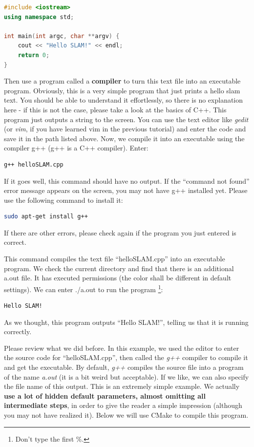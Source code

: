 \begin{lstlisting}[language=C++,caption=slambook2/ch2/helloSLAM.cpp]
#include <iostream>
using namespace std;

int main(int argc, char **argv) {
    cout << "Hello SLAM!" << endl;
    return 0;
}
\end{lstlisting}

Then use a program called a \textbf{compiler} to turn this text file into an executable program. Obviously, this is a very simple program that just prints a hello slam text. You should be able to understand it effortlessly, so there is no explanation here - if this is not the case, please take a look at the basics of C++. This program just outputs a string to the screen. You can use the text editor like \textit{gedit} (or \textit{vim}, if you have learned vim in the previous tutorial) and enter the code and save it in the path listed above. Now, we compile it into an executable using the compiler g++ (g++ is a C++ compiler). Enter:

\begin{lstlisting}[language=sh,caption=Terminal input:]
g++ helloSLAM.cpp
\end{lstlisting}

If it goes well, this command should have no output. If the ``command not found'' error message appears on the screen, you may not have g++ installed yet. Please use the following command to install it:
\begin{lstlisting}[language=sh,caption=Terminal input:]
sudo apt-get install g++
\end{lstlisting}
If there are other errors, please check again if the program you just entered is correct.

This command compiles the text file ``helloSLAM.cpp'' into an executable program. We check the current directory and find that there is an additional a.out file. It has executed permissions (the color shall be different in default settings). We can enter ./a.out to run the program \footnote{Don't type the first \%. }:

\begin{lstlisting}[language=sh,caption=Terminal input:]
% ./a.out
Hello SLAM!
\end{lstlisting}

As we thought, this program outputs ``Hello SLAM!'', telling us that it is running correctly.

Please review what we did before. In this example, we used the editor to enter the source code for ``helloSLAM.cpp'', then called the \textit{g++} compiler to compile it and get the executable. By default, \textit{g++} compiles the source file into a program of the name \textit{a.out} (it is a bit weird but acceptable). If we like, we can also specify the file name of this output. This is an extremely simple example. We actually \textbf{use a lot of hidden default parameters, almost omitting all intermediate steps}, in order to give the reader a simple impression (although you may not have realized it). Below we will use CMake to compile this program.

